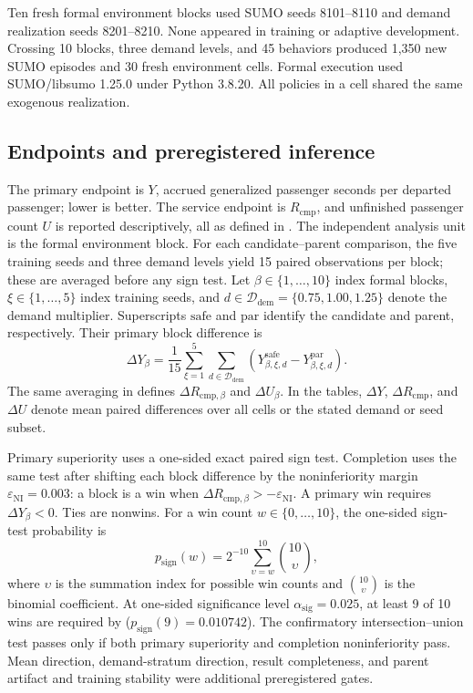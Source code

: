 Ten fresh formal environment blocks used SUMO seeds 8101--8110 and demand
realization seeds 8201--8210. None appeared in training or adaptive
development. Crossing 10 blocks, three demand levels, and 45 behaviors produced
1,350 new SUMO episodes and 30 fresh environment cells. Formal execution used
SUMO/libsumo 1.25.0 under Python 3.8.20. All policies in a cell shared the same
exogenous realization.

\subsection{Endpoints and preregistered inference}
\label{sec:exp:statistics}

The primary endpoint is $Y$, accrued generalized passenger seconds per departed
passenger; lower is better. The service endpoint is $R_{\mathrm{cmp}}$, and
unfinished passenger count $U$ is reported descriptively, all as defined in
. The independent analysis unit is the formal environment block.
For each candidate--parent comparison, the five training seeds and three demand
levels yield 15 paired observations per block; these are averaged before any
sign test. Let $\beta\in\{1,\ldots,10\}$ index formal blocks,
$\xi\in\{1,\ldots,5\}$ index training seeds, and
$d\in\mathcal{D}_{\mathrm{dem}}=\{0.75,1.00,1.25\}$ denote the demand
multiplier. Superscripts $\mathrm{safe}$ and $\mathrm{par}$ identify the
candidate and parent, respectively. Their primary block difference is
\begin{equation}
\Delta Y_{\beta}=\frac{1}{15}
\sum_{\xi=1}^{5}\sum_{d\in\mathcal{D}_{\mathrm{dem}}}
\left(Y^{\mathrm{safe}}_{\beta,\xi,d}
-Y^{\mathrm{par}}_{\beta,\xi,d}\right).
\label{eq:block_difference}
\end{equation}
The same averaging in  defines
$\Delta R_{\mathrm{cmp},\beta}$ and $\Delta U_{\beta}$. In the tables,
$\Delta Y$, $\Delta R_{\mathrm{cmp}}$, and $\Delta U$ denote mean paired
differences over all cells or the stated demand or seed subset.

Primary superiority uses a one-sided exact paired sign test. Completion uses
the same test after shifting each block difference by the noninferiority margin
$\varepsilon_{\mathrm{NI}}=0.003$: a block is a win when
$\Delta R_{\mathrm{cmp},\beta}>-\varepsilon_{\mathrm{NI}}$.
A primary win requires $\Delta Y_{\beta}<0$. Ties are nonwins. For a win
count $w\in\{0,\ldots,10\}$, the one-sided sign-test probability is
\begin{equation}
p_{\mathrm{sign}}(w)=2^{-10}\sum_{\upsilon=w}^{10}
\binom{10}{\upsilon},
\label{eq:sign_probability}
\end{equation}
where $\upsilon$ is the summation index for possible win counts and
$\binom{10}{\upsilon}$ is the binomial coefficient. At
one-sided significance level $\alpha_{\mathrm{sig}}=0.025$, at least 9 of
10 wins are required by 
($p_{\mathrm{sign}}(9)=0.010742$). The confirmatory intersection--union test passes
only if both primary superiority and completion noninferiority pass. Mean
direction, demand-stratum direction, result completeness, and parent artifact
and training stability were additional preregistered gates.

